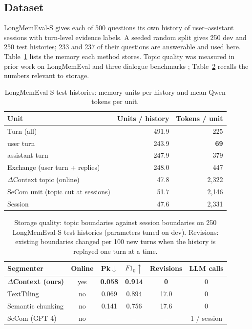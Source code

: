 \documentclass[conference]{IEEEtran}
\newcommand{\dc}{$\Delta$Context}
\begin{document}
\subsection{Dataset}
LongMemEval-S \cite{wu2025longmemeval} gives each of 500 questions its own
history of user--assistant sessions with turn-level evidence labels.
A seeded random split gives 250 dev and 250 test histories; 233 and 237 of their
questions are answerable and used here. Table~\ref{tab:data} lists the memory
each method stores. Topic quality was measured in prior work on LongMemEval and
three dialogue benchmarks \cite{jiang2023superdialseg,xie2021tiage,xu2021dialseg711};
Table~\ref{tab:storage} recalls the numbers relevant to storage.

\begin{table}[t]
\centering
\caption{LongMemEval-S test histories: memory units per history and mean Qwen tokens per unit.}
\label{tab:data}
\footnotesize
\setlength{\tabcolsep}{4pt}
\begin{tabular}{@{}lrr@{}}
\toprule
Unit & Units / history & Tokens / unit \\
\midrule
Turn (all) & 491.9 & 225 \\
\quad user turn & 243.9 & \textbf{69} \\
\quad assistant turn & 247.9 & 379 \\
Exchange (user turn + replies) & 248.0 & 447 \\
\dc{} topic (online) & 47.8 & 2{,}322 \\
SeCom unit (topic cut at sessions) & 51.7 & 2{,}146 \\
Session & 47.6 & 2{,}331 \\
\bottomrule
\end{tabular}
\end{table}

\begin{table}[t]
\centering
\caption{Storage quality: topic boundaries against session boundaries on 250 LongMemEval-S test histories (parameters tuned on dev). Revisions: existing boundaries changed per 100 new turns when the history is replayed one turn at a time.}
\label{tab:storage}
\footnotesize
\setlength{\tabcolsep}{3.5pt}
\begin{tabular}{@{}lccccc@{}}
\toprule
Segmenter & Online & Pk$\downarrow$ & $F1_0\uparrow$ & Revisions & LLM calls \\
\midrule
\textbf{\dc{} (ours)} & yes & \textbf{0.058} & \textbf{0.914} & \textbf{0} & 0 \\
TextTiling \cite{hearst1997texttiling} & no & 0.069 & 0.894 & 17.0 & 0 \\
Semantic chunking \cite{langchain2024semantic} & no & 0.141 & 0.756 & 17.6 & 0 \\
SeCom (GPT-4) \cite{pan2025secom} & no & -- & -- & -- & 1 / session \\
\bottomrule
\end{tabular}
\end{table}
\end{document}
